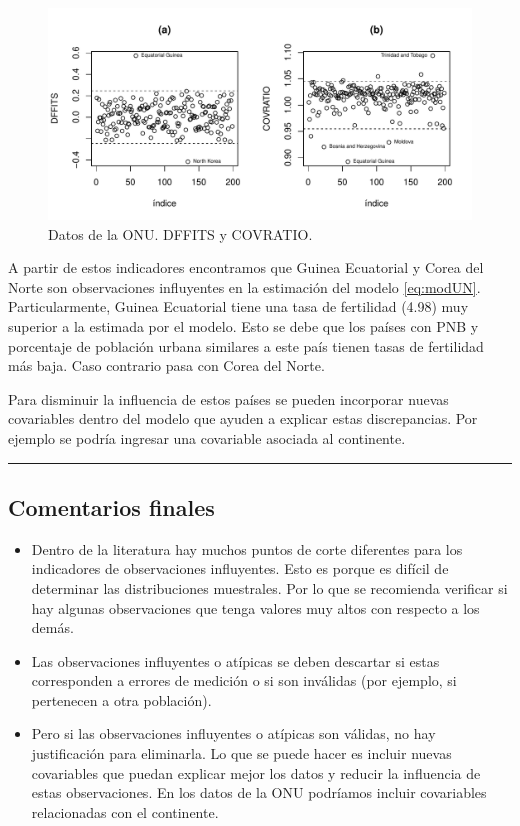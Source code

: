 \documentclass[
]{article}
\providecommand{\tightlist}{%
  \setlength{\itemsep}{0pt}\setlength{\parskip}{0pt}}
\begin{document}
\begin{figure}

{\centering \includegraphics{MLGI_files/figure-latex/UNdataOtros-1} 

}

\caption{Datos de la ONU. DFFITS y COVRATIO.}\label{fig:UNdataOtros}
\end{figure}

A partir de estos indicadores encontramos que Guinea Ecuatorial y Corea del Norte son observaciones influyentes en la estimación del modelo \eqref{eq:modUN}. Particularmente, Guinea Ecuatorial tiene una tasa de fertilidad (4.98) muy superior a la estimada por el modelo. Esto se debe que los países con PNB y porcentaje de población urbana similares a este país tienen tasas de fertilidad más baja. Caso contrario pasa con Corea del Norte.

Para disminuir la influencia de estos países se pueden incorporar nuevas covariables dentro del modelo que ayuden a explicar estas discrepancias. Por ejemplo se podría ingresar una covariable asociada al continente.

\rule{\textwidth}{0.4pt}

\hypertarget{comentarios-finales-1}{%
\subsection{Comentarios finales}\label{comentarios-finales-1}}

\begin{itemize}
\tightlist
\item
  Dentro de la literatura hay muchos puntos de corte diferentes para los indicadores de observaciones influyentes. Esto es porque es difícil de determinar las distribuciones muestrales. Por lo que se recomienda verificar si hay algunas observaciones que tenga valores muy altos con respecto a los demás.
\item
  Las observaciones influyentes o atípicas se deben descartar si estas corresponden a errores de medición o si son inválidas (por ejemplo, si pertenecen a otra población).
\item
  Pero si las observaciones influyentes o atípicas son válidas, no hay justificación para eliminarla. Lo que se puede hacer es incluir nuevas covariables que puedan explicar mejor los datos y reducir la influencia de estas observaciones. En los datos de la ONU podríamos incluir covariables relacionadas con el continente.
\end{itemize}

  
\end{document}
